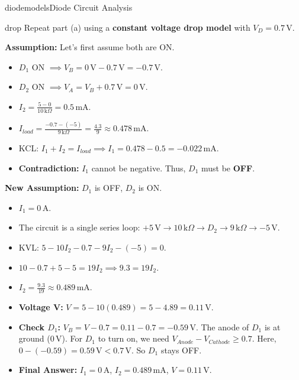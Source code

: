 \begin{mainquestion}{diodemodels}{Diode Circuit Analysis}
\begin{partquestion}{drop}
{Repeat part (a) using a \textbf{constant voltage drop model} with $V_D = 0.7\,\text{V}$.}

\begin{answer}
        \textbf{Assumption:} Let's first assume both are ON.
        \begin{itemize}
            \item $D_1$ ON $\implies V_B = 0\,\text{V} - 0.7\,\text{V} = -0.7\,\text{V}$.
            \item $D_2$ ON $\implies V_A = V_B + 0.7\,\text{V} = 0\,\text{V}$.
            \item $I_2 = \frac{5 - 0}{10\,\text{k}\Omega} = 0.5\,\text{mA}$.
            \item $I_{load} = \frac{-0.7 - (-5)}{9\,\text{k}\Omega} = \frac{4.3}{9} \approx 0.478\,\text{mA}$.
            \item KCL: $I_1 + I_2 = I_{load} \implies I_1 = 0.478 - 0.5 = -0.022\,\text{mA}$.
            \item \textbf{Contradiction:} $I_1$ cannot be negative. Thus, $D_1$ must be \textbf{OFF}.
        \end{itemize}
        
        \textbf{New Assumption:} $D_1$ is OFF, $D_2$ is ON.
        \begin{itemize}
            \item $I_1 = 0\,\text{A}$.
            \item The circuit is a single series loop: $+5\,\text{V} \to 10\,\text{k}\Omega \to D_2 \to 9\,\text{k}\Omega \to -5\,\text{V}$.
            \item KVL: $5 - 10 I_2 - 0.7 - 9 I_2 - (-5) = 0$.
            \item $10 - 0.7 + 5 - 5 = 19 I_2 \implies 9.3 = 19 I_2$.
            \item $I_2 = \frac{9.3}{19} \approx 0.489\,\text{mA}$.
            \item \textbf{Voltage V:} $V = 5 - 10(0.489) = 5 - 4.89 = 0.11\,\text{V}$.
            \item \textbf{Check $D_1$:} $V_B = V - 0.7 = 0.11 - 0.7 = -0.59\,\text{V}$. The anode of $D_1$ is at ground ($0\,\text{V}$). For $D_1$ to turn on, we need $V_{Anode} - V_{Cathode} \ge 0.7$. Here, $0 - (-0.59) = 0.59\,\text{V} < 0.7\,\text{V}$. So $D_1$ stays OFF.
            \item \textbf{Final Answer:} $I_1 = 0\,\text{A}$, $I_2 = 0.489\,\text{mA}$, $V = 0.11\,\text{V}$.
        \end{itemize}
\end{answer}


\end{partquestion}
\end{mainquestion}
